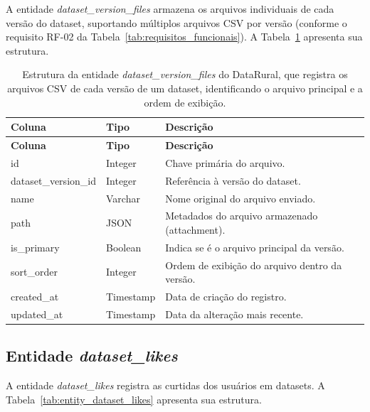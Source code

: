 A entidade \textit{dataset\_version\_files} armazena os arquivos individuais de cada versão do dataset, suportando múltiplos arquivos CSV por versão (conforme o requisito RF-02 da Tabela~\ref{tab:requisitos_funcionais}). A Tabela~\ref{tab:entity_dataset_version_files} apresenta sua estrutura.

\begin{longtable}{p{}p{}p{}}
\caption{Estrutura da entidade \textit{dataset\_version\_files} do DataRural, que registra os arquivos CSV de cada versão de um dataset, identificando o arquivo principal e a ordem de exibição.}\label{tab:entity_dataset_version_files}\\
\toprule
\textbf{Coluna} & \textbf{Tipo} & \textbf{Descrição} \\
\midrule
\endfirsthead
\toprule
\textbf{Coluna} & \textbf{Tipo} & \textbf{Descrição} \\
\midrule
\endhead
id & Integer & Chave primária do arquivo. \\
dataset\_version\_id & Integer & Referência à versão do dataset. \\
name & Varchar & Nome original do arquivo enviado. \\
path & JSON & Metadados do arquivo armazenado (attachment). \\
is\_primary & Boolean & Indica se é o arquivo principal da versão. \\
sort\_order & Integer & Ordem de exibição do arquivo dentro da versão. \\
created\_at & Timestamp & Data de criação do registro. \\
updated\_at & Timestamp & Data da alteração mais recente. \\
\bottomrule
\end{longtable}

\subsection{Entidade \textit{dataset\_likes}}

A entidade \textit{dataset\_likes} registra as curtidas dos usuários em datasets. A Tabela~\ref{tab:entity_dataset_likes} apresenta sua estrutura.

